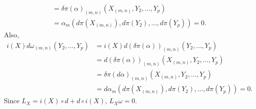 \begin{enumerate}
\begin{align*}
&=\delta \pi(\alpha)_{(m, n)}(X_{(m, n)}, Y_{2}, \ldots, Y_{p})\\
&=\alpha_{m}(d \pi(X_{(m, n)}), d \pi(Y_{2}), \ldots, d \pi(Y_{p}))=0.
\end{align*}
Also,
\begin{align*}
i(X) d \omega_{(m, n)}(Y_{2}, \ldots, Y_{p})
&=i(X) d(\delta \pi(\alpha))_{(m, n)}(Y_{2}, \ldots, Y_{p})\\
&=d(\delta \pi(\alpha))_{(m, n)}(X_{(m, n)}, Y_{2}, \ldots, Y_{p})\\
&=\delta \pi(d \alpha)_{(m, n)}(X_{(m, n)}, Y_{2}, \ldots, Y_{p})\\
&=d \alpha_{m}(d \pi(X_{(m, n)}), d \pi(Y_{2}), \ldots, d \pi(Y_{p}))=0.
\end{align*}
Since $L_{X}=i(X) \circ d+d \circ i(X)$, $L_{X} \omega=0$.


\end{enumerate}
